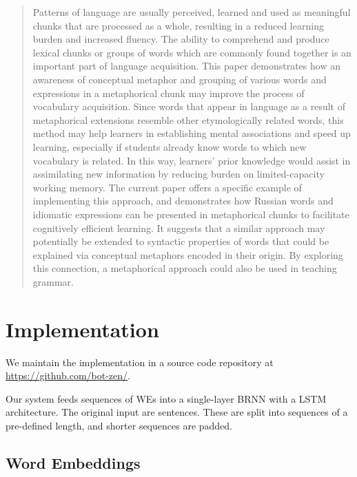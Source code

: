 \documentclass[11pt,a4paper]{article}
\begin{document}
\begin{quotation}
Patterns of language are usually perceived, learned and used as meaningful chunks that are processed as a whole, resulting in a reduced learning burden and increased fluency. The ability to comprehend and produce lexical chunks or groups of words which are commonly found together is an important part of language acquisition. This paper demonstrates how an awareness of conceptual metaphor and grouping of various words and expressions in a metaphorical chunk may improve the process of vocabulary acquisition. Since words that appear in language as a result of metaphorical extensions resemble other etymologically related words, this method may help learners in establishing mental associations and speed up learning, especially if students already know words to which new vocabulary is related. In this way, learners' prior knowledge would assist in assimilating new information by reducing burden on limited-capacity working memory. The current paper offers a specific example of implementing this approach, and demonstrates how Russian words and idiomatic expressions can be presented in metaphorical chunks to facilitate cognitively efficient learning. It suggests that a similar approach may potentially be extended to syntactic properties of words that could be explained via conceptual metaphors encoded in their origin. By exploring this connection, a metaphorical approach could also be used in teaching grammar.
\end{quotation}
\cite{Kalyuga2008}


\section{Implementation} %
\label{sec:implementation}

We maintain the implementation in a source code repository at
\url{https://github.com/bot-zen/}.  

Our system feeds sequences of WEs into a single-layer BRNN with a LSTM architecture. The original input are sentences. These are split into sequences of a pre-defined length, and shorter sequences are padded.


\subsection{Word Embeddings} %
\end{document}
